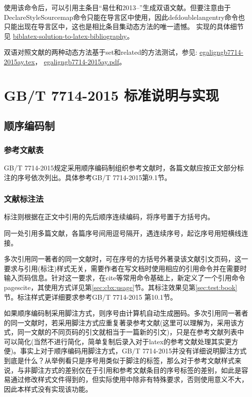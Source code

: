 使用该命令后，可以引用主条目“易仕和2013--”生成双语文献。但要注意由于DeclareStyleSourcemap命令只能在导言区中使用，因此defdoublelangentry命令也只能出现在导言区中，这也是相比条目集动态方法的唯一遗憾。
实现的具体细节见
\href{https://github.com/hushidong/biblatex-solution-to-latex-bibliography}%
{biblatex-solution-to-latex-bibliography}。

双语对照文献的两种动态方法基于set和related的方法测试，参见:
\href{run:./example/egaligngb7714-2015ay.tex}{egaligngb7714-2015ay.tex}，
\href{run:./example/egaligngb7714-2015ay.pdf}{egaligngb7714-2015ay.pdf}。

\section{GB/T 7714-2015 标准说明与实现}

\subsection{顺序编码制}

\subsubsection{参考文献表}\label{sec:bib:serialno}

GB/T 7714-2015规定采用顺序编码制组织参考文献时，各篇文献应按正文部分标注的序号依次列出。具体参考GB/T 7714-2015第9.1节。

\subsubsection{文献标注法}
标注则根据在正文中引用的先后顺序连续编码，将序号置于方括号内。

同一处引用多篇文献，各篇序号间用逗号隔开，遇连续序号，起讫序号用短横线连接。

多次引用同一著者的同一文献时，可在序号的方括号外著录该文献引文页码，这一要求与引用(标注)样式无关，需要作者在写文档时使用相应的引用命令并在需要时输入页码信息。针对这一要求，在cite等常用命令基础上，新定义了一个引用命令pagescite，其使用方式详见第\ref{sec:cbx:usage}节。其标注效果见第\ref{sec:test:book}节。标注样式更详细要求参考GB/T 7714-2015 第10.1节。

如果顺序编码制采用脚注方式，则序号由计算机自动生成圈码。多次引用同一著者的同一文献时，若采用脚注方式应重复著录参考文献(这里可以理解为，采用该方式，同一文献的不同页码的引文就相当于一篇新的引文)，只是在参考文献列表中可以简化(当然不进行简化，简单复制后录入对于latex的参考文献处理其实更方便)。事实上对于顺序编码用脚注方式，GB/T 7714-2015并没有详细说明脚注方式到底是什么？从举例看只是序号用类似于脚注的标签，那么对于参考文献样式来说，与非脚注方式的差别仅在于引用和参考文献条目的序号标签的差别，如此是容易通过修改样式文件得到的，但实际使用中除非有特殊要求，否则使用意义不大，因此本样式没有实现该功能。

